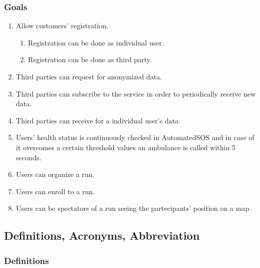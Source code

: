 \documentclass[a4paper]{article}
\begin{document}
\subsubsection{Goals}

\begin{enumerate}[label*={G.\arabic*}]
    
    
    \item Allow customers' registration.
    \begin{enumerate}[label*=.\arabic*]
        \item Registration can be done as individual user.
        \item Registration can be done as third party.
    \end{enumerate}
    
    \item Third parties can request for anonymized data.

    \item Third parties can subscribe to the service in order to periodically receive new data.
        
    \item Third parties can receive for a individual user's data.
    
    \item Users' health status is continuously checked in AutomatedSOS and in case of it overcomes a certain threshold values an ambulance is called within 5 seconds.
    
    \item Users can organize a run.
    \item Users can enroll to a run.
    \item Users can be spectators of a run seeing the partecipants' position on a map.
    
\end{enumerate}

\clearpage

\subsection{Definitions, Acronyms, Abbreviation}

\subsubsection{Definitions}
    
\end{document}
